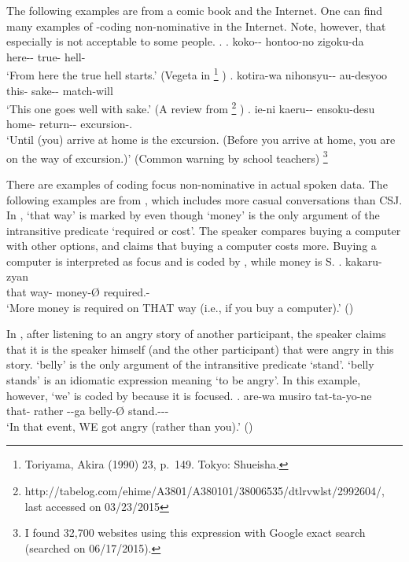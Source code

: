 The following examples are from a comic book and the Internet.
One can find many examples of -coding non-nominative in the Internet.
Note, however, that
especially \Next[b] is not acceptable to some people.
%
\ex.
 \ag. koko-- hontoo-no zigoku-da \\
      here-- true- hell- \\
      `From here the true hell starts.'
      \hfill{(Vegeta in %
      \footnote{
      Toriyama, Akira (1990)  23, p.~149. Tokyo: Shueisha.
      }
      )}
 \bg. kotira-wa nihonsyu-- au-desyoo \\
      this- sake-- match-will \\
      `This one goes well with sake.'
      \hfill{(A review from %
       \footnote{http://tabelog.com/ehime/A3801/A380101/38006535/dtlrvwlst/2992604/, last accessed on 03/23/2015}
      )}
  \bg. ie-ni kaeru-- ensoku-desu \\
       home- return-- excursion-. \\
       `Until (you) arrive at home is the excursion. (Before you arrive at home, you are on the way of excursion.)'
       \hfill{(Common warning by school teachers)}%
       \footnote{
       I found 32,700 websites using this expression with Google exact search (searched on 06/17/2015).
       }


There are examples of  coding focus non-nominative
in actual spoken data.
The following examples are from  \cite{Den_2007_SAC},
which includes more casual conversations than CSJ.
In \Next,
 `that way' is marked by  even though  `money' is the only argument of the intransitive predicate  `required or cost'.
The speaker compares buying a computer with other options,
and claims that buying a computer costs more.
Buying a computer is interpreted as focus and is coded by ,
while money is S.
%
\exg.    kakaru-zyan \\
	that way- money-{\O} required.- \\
	`More money is required on THAT way (i.e., if you buy a computer).' \hfill{()}

In \Next,
after listening to an angry story of another participant,
the speaker claims that it is the speaker himself (and the other participant) that were angry in this story.
 `belly' is the only argument of the intransitive predicate  `stand'.
 `belly stands' is an idiomatic expression meaning `to be angry'.
In this example,
however,
 `we' is coded by 
because it is focused.
\exg. are-wa musiro   tat-ta-yo-ne \\
	that- rather --ga belly-{\O} stand.--- \\
	`In that event, WE got angry (rather than you).' \hfill{()}

